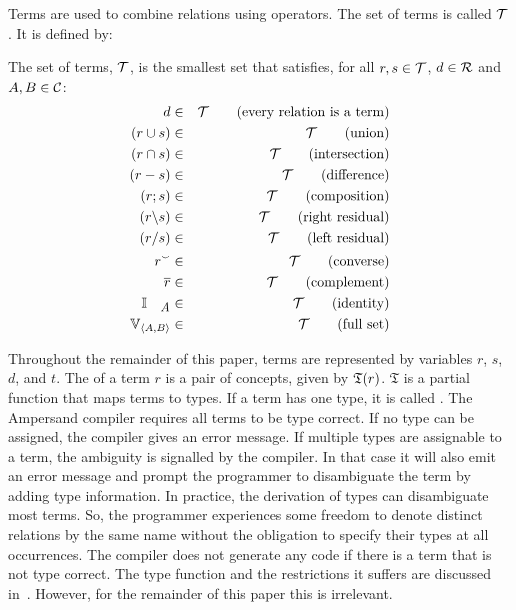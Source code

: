\documentclass{svproc}
\begin{document}
	Terms are used to combine relations using operators.
	The set of terms is called $\mathcal{T}$. It is defined by:
\begin{definition}[terms]
\label{def:terms}
\item   The set of terms, $\mathcal{T}$, is the smallest set that satisfies, for all $r,s \in \mathcal{T}$, $d\in\mathcal{R}$ and $A,B \in \mathcal{C}$: 
\begin{eqnarray}
	d&\in&\terms         \quad\quad\text{(every relation is a term)}\\
	(r \cup s)&\in&\terms\quad\quad\text{(union)}\\
	(r \cap s)&\in&\terms\quad\quad\text{(intersection)}\\
	(r-s)&\in&\terms     \quad\quad\text{(difference)}\label{def:difference}\\
	(r;s)&\in&\terms     \quad\quad\text{(composition)}\\
	(r\backslash s)&\in&\terms     \quad\quad\text{(right residual)}\\
	(r\slash s)&\in&\terms     \quad\quad\text{(left residual)}\\
	\flip r&\in&\terms   \quad\quad\text{(converse)}\\
	\cmpl{r}&\in&\terms   \quad\quad\text{(complement)}\\
	\ident{A}&\in&\terms \quad\quad\text{(identity)}\\
	\fullt{A}{B}&\in&\terms \quad\quad\text{(full set)}
\end{eqnarray}
\end{definition}
	Throughout the remainder of this paper,	terms are represented by variables $r$, $s$, $d$, and $t$.
	The  of a term $r$ is a pair of concepts, given by $\mathfrak{T}(r)$.
	$\mathfrak{T}$ is a partial function that maps terms to types.
	If a term has one type, it is called .
	The Ampersand compiler requires all terms to be type correct.
	If no type can be assigned, the compiler gives an error message.
	If multiple types are assignable to a term, the ambiguity is signalled by the compiler.
	In that case it will also emit an error message and prompt the programmer to disambiguate the term by adding type information.
	In practice, the derivation of types can disambiguate most terms.
	So, the programmer experiences some freedom to denote distinct relations by the same name without the obligation to specify their types at all occurrences.
	The compiler does not generate any code if there is a term that is not type correct.
	The type function and the restrictions it suffers are discussed in~\cite{Joosten2015}.
	However, for the remainder of this paper this is irrelevant.
\end{document}
